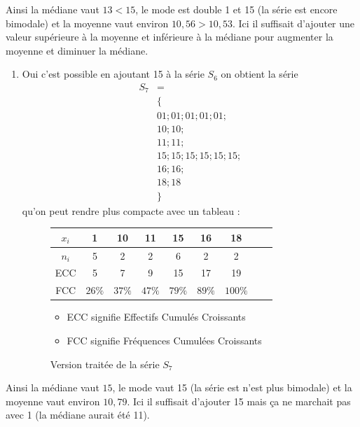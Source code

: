 \documentclass[11pt]{article}
\begin{document}
Ainsi la médiane vaut \(13 < 15\), le mode est double 1 et 15 (la série est encore bimodale) et la moyenne vaut environ \(10,56 > 10,53\). Ici il suffisait d'ajouter une valeur supérieure à la moyenne et inférieure à la médiane pour augmenter la moyenne et diminuer la médiane.
\begin{enumerate}
\item Oui c'est possible en ajoutant 15 à la série \(S_6\) on obtient la série 
\begin{align*}
	S_7 &= \\
	& \{ \\
	& 01 ; 01 ; 01 ; 01 ; 01 ; \\
	& 10 ; 10 ; \\
	& 11 ; 11 ; \\
	& 15 ; 15 ; 15 ; 15 ; 15 ; 15 ; \\
	& 16 ; 16 ; \\
	& 18 ; 18 \\
	&\}
\end{align*}
qu'on peut rendre plus compacte avec un tableau :

\begin{center}
	\begin{figure}[H]
	\caption{Version traitée de la série $S_7$}
	\centering
	\vspace{.5cm}
	\begin{tabular}{*{9}{|c}|}
		\hline
		$x_i$ & 1 & 10 & 11 & 15 & 16 & 18 \\
		\hline
		$n_i$ & 5 & 2 & 2 & 6 & 2 & 2 \\
		\hline
		ECC & 5 & 7 & 9 & 15 & 17 & 19\\
		\hline
		FCC & $26\%$ & $37\%$ & $47\%$ & $79\%$ & $89\%$ & $100\%$  \\
		\hline
	\end{tabular}
		\vspace{.5cm}
		\begin{itemize}
			\item ECC signifie Effectifs Cumulés Croissants
			\item FCC signifie Fréquences Cumulées Croissants
		\end{itemize}
	\end{figure}
\end{center}
\end{enumerate}


Ainsi la médiane vaut \(15\), le mode vaut 15 (la série est
n'est plus bimodale) et la moyenne vaut environ \(10,79\). Ici
il suffisait d'ajouter 15 mais ça ne marchait pas avec 1 (la
médiane aurait été 11).
\end{document}
